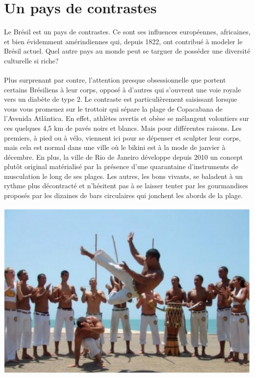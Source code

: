 \section{Un pays de contrastes}
\paragraph{}
Le	Brésil	est	un	pays	de	contrastes.	Ce	sont	ses	influences européennes, africaines,	et	bien	évidemment	amérindiennes	qui,	depuis	1822,	ont contribué	à	modeler	le Brésil	actuel.	Quel	autre	pays	au	monde	peut	se targuer	de	posséder	une	diversité culturelle	si	riche?
\paragraph{}
Plus	surprenant	par	contre,	l’attention	presque	obsessionnelle	que	portent	certains Brésiliens	à	leur	corps,	opposé	à	d’autres	qui	s’ouvrent	une	voie royale	vers	un diabète	de	type	2.	Le	contraste	est	particulièrement saisissant	lorsque	vous	vous promenez	sur	le	trottoir	qui	sépare	la	plage de	Copacabana	de	l’Avenida	Atlântica. En	effet,	athlètes	avertis	et	obèse se	mélangent	volontiers	sur	ces	quelques	4,5	km de	pavés	noirs	et	blancs. Mais	pour	différentes	raisons.	Les	premiers,	à	pied	ou	à	vélo,	viennent ici	pour	se	dépenser	et	sculpter	leur corps,	mais	cela	est	normal dans	une	ville	où	le	bikini	est	à	la	mode	de	janvier	à	décembre.	En	plus,	la ville	de	Rio	de Janeiro	développe	depuis	2010	un	concept	plutôt original matérialisé	par	la présence d’une	quarantaine	d’instruments	de	musculation	le long	de	ses	plages.	Les	autres,	les	bons	vivants,	se	baladent	à	un rythme plus	décontracté	et	n’hésitent	pas	à	se	laisser	tenter	par	les gourmandises	proposés	par	les	dizaines	de	bars	circulaires	qui	jonchent les	abords	de	la	plage.
\begin{center}
\includegraphics[scale=0.5]{bresil2.png}
\end{center}

